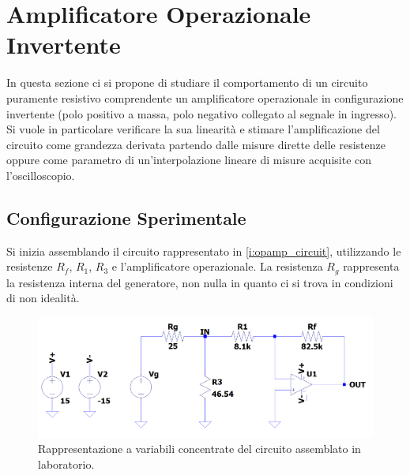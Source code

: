 \documentclass[a4paper,11pt]{article} %
\begin{document}
\cleardoublepage



\section{Amplificatore Operazionale Invertente}
In questa sezione ci si propone di studiare il comportamento di un circuito puramente resistivo comprendente un
amplificatore operazionale in configurazione invertente (polo positivo a massa, polo negativo collegato al segnale in
ingresso). Si vuole in particolare verificare la sua linearità e stimare l'amplificazione del circuito come grandezza
derivata partendo dalle misure dirette delle resistenze oppure come parametro di un'interpolazione lineare di misure
acquisite con l'oscilloscopio. 



\subsection{Configurazione Sperimentale}

Si inizia assemblando il circuito rappresentato in  \autoref{i:opamp_circuit}, utilizzando le resistenze $R_f$, $R_1$,
$R_3$ e l'amplificatore operazionale. La resistenza $R_g$ rappresenta la resistenza interna del generatore, non nulla in
quanto ci si trova in condizioni di non idealità. 

\begin{figure}[H]
	\centering
	\includegraphics[width=\linewidth]{../Simulations/OpAmp/circuit_image_nosim.png}
	\caption{Rappresentazione a variabili concentrate del circuito assemblato in laboratorio.}
	\label{i:opamp_circuit}
\end{figure}
\end{document}
